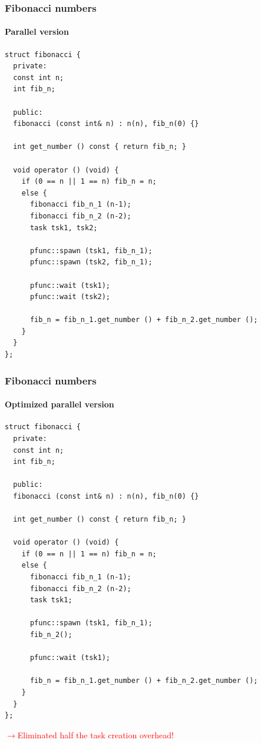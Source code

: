 \documentclass{beamer}
\begin{document}
\begin{frame}[fragile]
\frametitle{Fibonacci numbers}
\framesubtitle{Parallel version}
\begin{center}
\begin{minipage}{0.5\textwidth}
\begin{lstlisting}
struct fibonacci {
  private:
  const int n;
  int fib_n;

  public:
  fibonacci (const int& n) : n(n), fib_n(0) {}

  int get_number () const { return fib_n; }

  void operator () (void) {
    if (0 == n || 1 == n) fib_n = n;
    else {
      fibonacci fib_n_1 (n-1);
      fibonacci fib_n_2 (n-2);
      task tsk1, tsk2;

      pfunc::spawn (tsk1, fib_n_1);
      pfunc::spawn (tsk2, fib_n_1);

      pfunc::wait (tsk1);
      pfunc::wait (tsk2);

      fib_n = fib_n_1.get_number () + fib_n_2.get_number ();
    }
  }
};
\end{lstlisting}
\end{minipage}
\end{center}
\end{frame}

\begin{frame}[fragile]
\frametitle{Fibonacci numbers}
\framesubtitle{Optimized parallel version}
\begin{center}
\begin{minipage}{0.5\textwidth}
\begin{lstlisting}
struct fibonacci {
  private:
  const int n;
  int fib_n;

  public:
  fibonacci (const int& n) : n(n), fib_n(0) {}

  int get_number () const { return fib_n; }

  void operator () (void) {
    if (0 == n || 1 == n) fib_n = n;
    else {
      fibonacci fib_n_1 (n-1);
      fibonacci fib_n_2 (n-2);
      task tsk1;

      pfunc::spawn (tsk1, fib_n_1);
      fib_n_2();

      pfunc::wait (tsk1);

      fib_n = fib_n_1.get_number () + fib_n_2.get_number ();
    }
  }
};
\end{lstlisting}
\end{minipage}
\end{center}
\begin{center}
\textcolor{red}{$\rightarrow{}$Eliminated half the task creation overhead!}
\end{center}
\end{frame}
\end{document}
